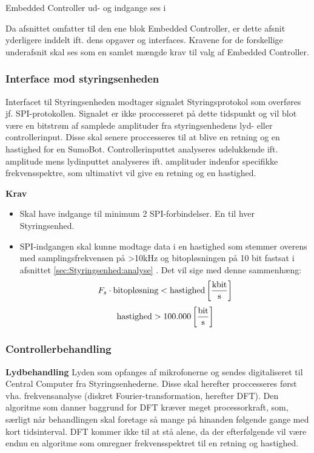 Embedded Controller ud- og indgange ses i   


Da afsnittet omfatter til den ene blok Embedded Controller, er dette afsnit yderligere inddelt ift. dens opgaver og interfaces. Kravene for de forskellige underafsnit skal ses som en samlet mængde krav til valg af Embedded Controller.

\subsubsection{Interface mod styringsenheden}
Interfacet til Styringsenheden modtager signalet Styringsprotokol som overføres jf. SPI-protokollen. Signalet er ikke proccesseret på dette tidspunkt og vil blot være en bitstrøm af samplede amplituder fra styringsenhedens lyd- eller controllerinput. Disse skal senere proccesseres til at blive en retning og en hastighed for en SumoBot. Controllerinputtet analyseres udelukkende ift. amplitude mens lydinputtet analyseres ift. amplituder indenfor specifikke frekvensspektre, som ultimativt vil give en retning og en hastighed. 

\textbf{Krav}
\begin{itemize}
\item Skal have indgange til minimum 2 SPI-forbindelser. En til hver Styringsenhed. 
\item SPI-indgangen skal kunne modtage data i en hastighed som stemmer overens med samplingsfrekvensen på >10kHz og bitopløsningen på 10 bit fastsat i afsnittet \ref{sec:Styringsenhed:analyse} \tbr. Det vil sige med denne sammenhæng: 
\[ F_s \cdot \text{bitopløsning} < \text{hastighed} \left[\si[per-mode=fraction]{\kilo\bit\per\second}\right] \]
\[ \text{hastighed} > 100.000 \left[\si[per-mode=fraction]{\bit\per\second}\right] \]
\end{itemize}

\subsubsection{Controllerbehandling}
\textbf{Lydbehandling}
Lyden som opfanges af mikrofonerne og sendes digitaliseret til Central Computer fra Styringsenhederne. Disse skal herefter proccesseres først vha. frekvensanalyse (diskret Fourier-transformation, herefter DFT). Den algoritme som danner baggrund for \gls{DFT} kræver meget processorkraft, som, særligt når behandlingen skal foretage så mange på hinanden følgende gange med kort tidsinterval. \gls{DFT} kommer ikke til at stå alene, da der efterfølgende vil være endnu en algoritme som omregner frekvensspektret til en retning og hastighed. 

